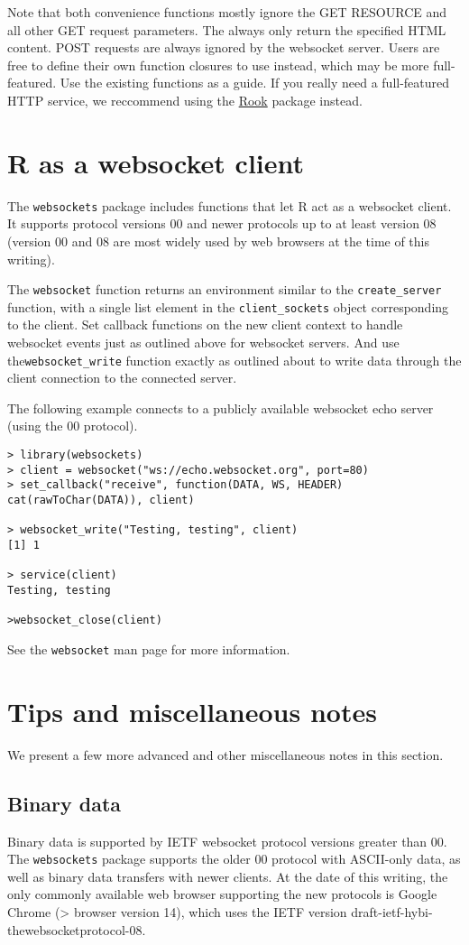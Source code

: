 \documentclass[12pt]{article}
\begin{document}
Note that both convenience functions mostly ignore the GET RESOURCE and 
all other GET request parameters. The always only return the specified HTML
content. POST requests are always ignored by the websocket server.
Users are free to define their own function closures to use
instead, which may be more full-featured. Use the existing functions
as a guide. If you really need a full-featured HTTP service,
we reccommend using the 
\href{http://cran.r-project.org/web/packages/Rook}{Rook} package
instead.


\section{R as a websocket client}
The {\tt websockets} package includes functions that let R act as a websocket
client. It supports protocol versions 00 and newer protocols up to at least
version 08 (version 00 and 08 are most widely used by web browsers at the time
of this writing).

The {\tt websocket} function returns an environment similar to the 
{\tt create\_server} function, with a single list element in the
{\tt client\_sockets} object corresponding to the client. Set
callback functions on the new client context to handle websocket
events just as outlined above for websocket servers. And use
the{\tt websocket\_write} function exactly as outlined about to
write data through the client connection to the connected server.

The following example connects to a publicly available websocket echo
server (using the 00 protocol).
\begin{lstlisting}
> library(websockets)
> client = websocket("ws://echo.websocket.org", port=80)
> set_callback("receive", function(DATA, WS, HEADER) cat(rawToChar(DATA)), client)

> websocket_write("Testing, testing", client)
[1] 1

> service(client)
Testing, testing

>websocket_close(client)
\end{lstlisting}
See the {\tt websocket} man page for more information.


\section{Tips and miscellaneous notes}
We present a few more advanced and other miscellaneous notes in this
section.
\subsection{Binary data}
Binary data is supported by IETF websocket protocol versions greater than
00. The {\tt websockets} package supports the older 00 protocol with
ASCII-only data, as well as binary data transfers with newer clients.
At the date of this writing, the only commonly available web browser
supporting the new protocols is Google Chrome (> browser version 14),
which uses the IETF version draft-ietf-hybi-thewebsocketprotocol-08.
\end{document}

